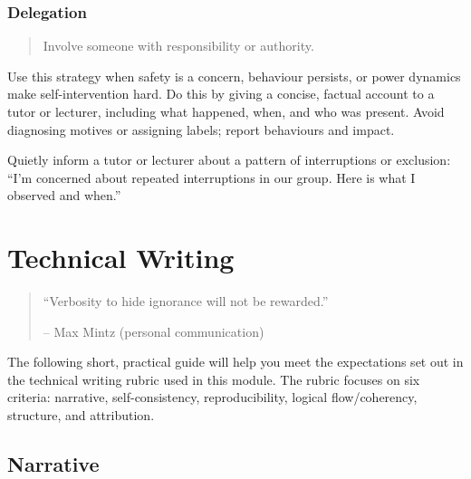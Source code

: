 \documentclass[
  a4paper,
  DIV=11,
  numbers=noendperiod,
  oneside]{scrreprt}
\begin{document}
\subsection{Delegation}\label{delegation}

\begin{quote}
Involve someone with responsibility or authority.
\end{quote}

Use this strategy when safety is a concern, behaviour persists, or power
dynamics make self-intervention hard. Do this by giving a concise,
factual account to a tutor or lecturer, including what happened, when,
and who was present. Avoid diagnosing motives or assigning labels;
report behaviours and impact.

\begin{tcolorbox}[enhanced jigsaw, opacitybacktitle=0.6, colframe=quarto-callout-note-color-frame, bottomrule=.15mm, coltitle=black, colback=white, title=\textcolor{quarto-callout-note-color}{\faInfo}\hspace{0.5em}{Example phrases}, breakable, toptitle=1mm, arc=.35mm, left=2mm, opacityback=0, rightrule=.15mm, bottomtitle=1mm, colbacktitle=quarto-callout-note-color!10!white, toprule=.15mm, leftrule=.75mm, titlerule=0mm]

Quietly inform a tutor or lecturer about a pattern of interruptions or
exclusion: ``I'm concerned about repeated interruptions in our group.
Here is what I observed and when.''

\end{tcolorbox}

\chapter{Technical Writing}\label{sec-technical-writing}

\begin{quote}
``Verbosity to hide ignorance will not be rewarded.''

-- Max Mintz (personal communication)
\end{quote}

The following short, practical guide will help you meet the expectations
set out in the technical writing rubric used in this module. The rubric
focuses on six criteria: narrative, self-consistency, reproducibility,
logical flow/coherency, structure, and attribution.

\section{Narrative}\label{sec-writing-narrative}
\end{document}

